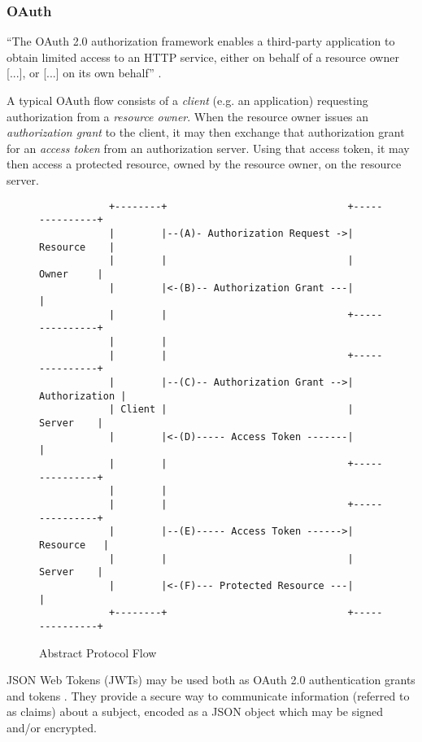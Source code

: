 \subsubsection{OAuth}
``The OAuth 2.0 authorization framework enables a third-party
application to obtain limited access to an HTTP service, either on
behalf of a resource owner [...], or [...] on its own behalf'' \autocite{Hardt2023}.

A typical OAuth flow consists of a \emph{client} (e.g. an application) requesting authorization from a \emph{resource owner}. When the resource owner issues an \emph{authorization grant} to the client, it may then exchange that authorization grant for an \emph{access token} from an authorization server. Using that access token, it may then access a protected resource, owned by the resource owner, on the resource server. \autocite{Hardt2023}
\begin{figure}[h]
    \begin{scriptsize}
        \begin{verbatim} 
            +--------+                               +---------------+
            |        |--(A)- Authorization Request ->|   Resource    |
            |        |                               |     Owner     |
            |        |<-(B)-- Authorization Grant ---|               |
            |        |                               +---------------+
            |        |
            |        |                               +---------------+
            |        |--(C)-- Authorization Grant -->| Authorization |
            | Client |                               |     Server    |
            |        |<-(D)----- Access Token -------|               |
            |        |                               +---------------+
            |        |
            |        |                               +---------------+
            |        |--(E)----- Access Token ------>|    Resource   |
            |        |                               |     Server    |
            |        |<-(F)--- Protected Resource ---|               |
            +--------+                               +---------------+
        \end{verbatim}
    \end{scriptsize}
    \caption{Abstract Protocol Flow \autocite{Hardt2023}}
\end{figure}

JSON Web Tokens (JWTs) may be used both as OAuth 2.0 authentication grants and tokens \autocite{Jones2015a, Bertocci2021}. They provide a secure way to communicate information (referred to as claims) about a subject, encoded as a JSON object which may be signed and/or encrypted. \autocite{Jones2015}

